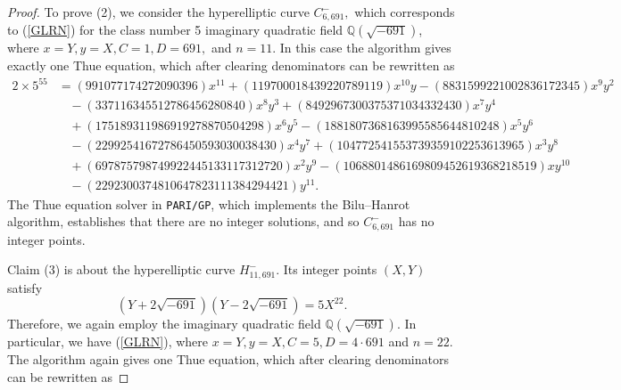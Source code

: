 \documentclass[12pt]{amsart}
\newcommand{\Q}{\mathbb{Q}}
\newcommand{\?}{\color{red}?}
\numberwithin{equation}{section}
\begin{document}
\begin{proof}
To prove (2), we consider the  hyperelliptic curve $C^{-}_{6,691},$ which  corresponds to (\ref{GLRN}) for the class number 5 imaginary quadratic field
$\Q(\sqrt{-691})$, where $x=Y, y=X, C=1, D=691,$ and $n=11.$  In this case the algorithm gives exactly one Thue equation, which after clearing denominators can be rewritten as
\small
\begin{displaymath}
\begin{split}
2\times5^{55}&=(991077174272090396)x^{11} + (119700018439220789119)x^{10}y
- (8831599221002836172345)x^9y^2\\
&\ \ \ \ -(337116345512786456280840)x^8y^3 
+ (8492967300375371034332430)x^7y^4\\
&\ \ \ \  + (175189311986919278870504298)x^6y^5 
- (1881807368163995585644810248)x^5y^6\\
&\ \ \ \  - (22992541672786450593030038430)x^4y^7 
+ (104772541553739359102253613965)x^3y^8\\
&\ \ \ \  + (697875798749922445133117312720)x^2y^9 
- (1068801486169809452619368218519)xy^{10}\\
&\ \ \ \  - (2292300374810647823111384294421)y^{11}.
\end{split}
\end{displaymath}
\normalsize
The Thue equation solver in \texttt{PARI/GP}, which implements the Bilu--Hanrot algorithm, establishes that there are no integer solutions, and so $C^{-}_{6,691}$ has no integer points.

Claim (3) is about the hyperelliptic curve $H^{-}_{11,691}.$  Its integer points $(X,Y)$  satisfy
$$
(Y+2\sqrt{-691})(Y-2\sqrt{-691})=5X^{22}.
$$
Therefore, we again employ the imaginary quadratic field $\Q(\sqrt{-691})$. In particular, we have (\ref{GLRN}), where $x=Y, y=X, C=5, D=4\cdot 691$ and $n=22$.
 The algorithm again gives one Thue equation, which after clearing denominators can be rewritten as


\end{proof}
\end{document}
